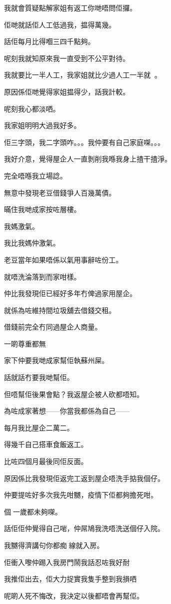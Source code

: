 我就會質疑點解家姐有返工你哋唔問佢攞。

佢哋就話佢人工低過我，揾得萬幾。

話佢每月比得嗰三四千點夠。

呢刻我就知原來我一直受到不公平對待。

我就要比一半人工，我家姐就比少過人工一半就。

原因係佢哋覺得家姐揾得少，話我計較。

呢刻我心都淡哂。

我家姐明明大過我好多。

佢三字頭，我二字頭咋。。。我仲要有自己家庭㗎。。。

我好介意，覺得屋企人一直剝削我喺我身上揸干揸淨。

完全唔喺我立場諗。

無意中發現老豆借錢爭人百幾萬債。

暪住我哋成家按咗層樓。

我媽激氣。

我比我媽仲激氣。

老豆當年如果唔係以氣用事辭咗份工。

就唔洗淪落到而家咁樣。

仲比我發現佢已經好多年冇俾過家用屋企。

就係為咗維持間垃圾舖去借錢交租。

借錢前完全冇同過屋企人商量。

一啲尊重都無

家下仲要我哋成家幫佢執蘇州屎。

話就話冇要我哋幫佢。

但唔幫佢後果會點？我返屋企被人砍都唔知。

為咗成家著想——你當我都係為自己——

每月我比屋企二萬二。

得幾千自己搭車食飯返工。

比咗四個月最後同佢反面。

原因係比我發現佢返完工返到屋企唔洗手掂我個仔。

仲要提咗好多次我先咁嬲，疫情下佢都夠擔死咁。

個一歲都未夠㗎。

話佢佢仲覺得自己啱，仲屌鳩我洗唔洗送個仔入院。

我嬲得濟講句你都痴線就入房。

佢衝入嚟仲踢入我房門鬧我話忍咗我好耐

我推佢出去，佢大力捉實我隻手整到我損哂

呢啲人死不悔改，我決定以後都唔會再幫佢。

